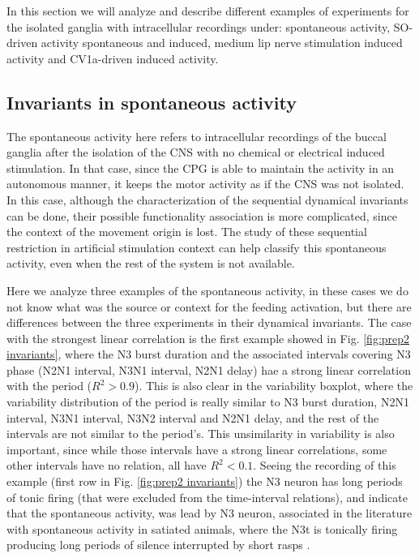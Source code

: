 
In this section we will analyze and describe different examples of experiments for the isolated ganglia with intracellular recordings under: spontaneous activity, SO-driven activity spontaneous and induced, medium lip nerve stimulation induced activity and CV1a-driven induced activity.



\subsection{Invariants in spontaneous activity}
The spontaneous activity here refers to intracellular recordings of the buccal ganglia after the isolation of the CNS with no chemical or electrical induced stimulation. In that case, since the CPG is able to maintain the activity in an autonomous manner, it keeps the motor activity as if the CNS was not isolated. In this case, although the characterization of the sequential dynamical invariants can be done, their possible functionality association is more complicated, since the context of the movement origin is lost. The study of these sequential restriction in artificial stimulation context can help classify this spontaneous activity, even when the rest of the system is not available. 

Here we analyze three examples of the spontaneous activity, in these cases we do not know what was the source or context for the feeding activation, but there are differences between the three experiments in their dynamical invariants. The case with the strongest linear correlation is the first example showed in Fig. \ref{fig:prep2 invariants}, where the N3 burst duration and the associated intervals covering N3 phase (N2N1 interval, N3N1 interval, N2N1 delay) hae a strong linear correlation with the period ($R^2 > 0.9$). This is also clear in the variability boxplot, where the variability distribution of the period is really similar to N3 burst duration, N2N1 interval, N3N1 interval, N3N2 interval and N2N1 delay, and the rest of the intervals are not similar to the period's. This unsimilarity in variability is also important, since while those intervals have a strong linear correlations, some other intervals have no relation, all have $R^2 < 0.1$. Seeing the recording of this example (first row in Fig. \ref{fig:prep2 invariants}) the N3 neuron has long periods of tonic firing (that were excluded from the time-interval relations), and indicate that the spontaneous activity, was lead by N3 neuron, associated in the literature with spontaneous activity in satiated animals, where the N3t is tonically firing producing long periods of silence interrupted by short rasps \parencite{staras_loss_2003,benjamin_distributed_2012}.


